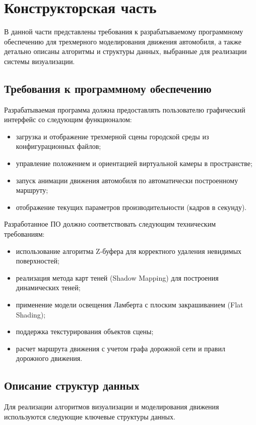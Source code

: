 \chapter{Конструкторская часть}

В данной части представлены требования к разрабатываемому программному обеспечению для трехмерного моделирования движения автомобиля, а также детально описаны алгоритмы и структуры данных, выбранные для реализации системы визуализации.

\section{Требования к программному обеспечению}

Разрабатываемая программа должна предоставлять пользователю графический интерфейс со следующим функционалом:
\begin{itemize}
	\item загрузка и отображение трехмерной сцены городской среды из конфигурационных файлов;
	\item управление положением и ориентацией виртуальной камеры в пространстве;
	\item запуск анимации движения автомобиля по автоматически построенному маршруту;
	\item отображение текущих параметров производительности (кадров в секунду).
\end{itemize}

Разработанное ПО должно соответствовать следующим техническим требованиям:
\begin{itemize}
	\item использование алгоритма Z-буфера для корректного удаления невидимых поверхностей;
	\item реализация метода карт теней (Shadow Mapping) для построения динамических теней;
	\item применение модели освещения Ламберта с плоским закрашиванием (Flat Shading);
	\item поддержка текстурирования объектов сцены;
	\item расчет маршрута движения с учетом графа дорожной сети и правил дорожного движения.
\end{itemize}

\section{Описание структур данных}

Для реализации алгоритмов визуализации и моделирования движения используются следующие ключевые структуры данных.

